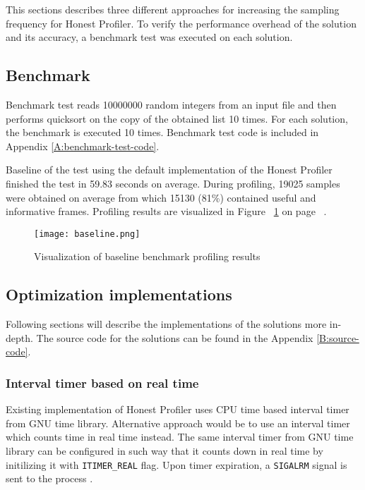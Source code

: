 \documentclass[..thesis.tex]{subfiles}
\begin{document}
This sections describes three different approaches for increasing the sampling frequency for Honest Profiler. To verify the performance overhead of the solution and its accuracy, a benchmark test was executed on each solution.

\subsection{Benchmark}
Benchmark test reads 10000000 random integers from an input file and then performs quicksort on the copy of the obtained list 10 times. For each solution, the benchmark is executed 10 times. Benchmark test code is included in Appendix \ref{A:benchmark-test-code}. 

Baseline of the test using the default implementation of the Honest Profiler finished the test in 59.83 seconds on average. During profiling, 19025 samples were obtained on average from which 15130 (81\%) contained useful and informative frames. Profiling results are visualized in Figure ~\ref{fig:baseline} on page ~\pageref{fig:baseline}. 

\begin{figure}[H]
\texttt{[image: baseline.png]}
\caption{Visualization of baseline benchmark profiling results}
\label{fig:baseline}
\end{figure}

\subsection{Optimization implementations}
Following sections will describe the implementations of the solutions more in-depth. The source code for the solutions can be found in the Appendix \ref{B:source-code}.

\subsubsection{Interval timer based on real time}
Existing implementation of Honest Profiler uses CPU time based interval timer from GNU time library. Alternative approach would be to use an interval timer which counts time in real time instead. The same interval timer from GNU time library can be configured in such way that it counts down in real time by initilizing it with \texttt{ITIMER\_REAL} flag. Upon timer expiration, a \texttt{SIGALRM} signal is sent to the process \cite{getitimer2}.
\end{document}
